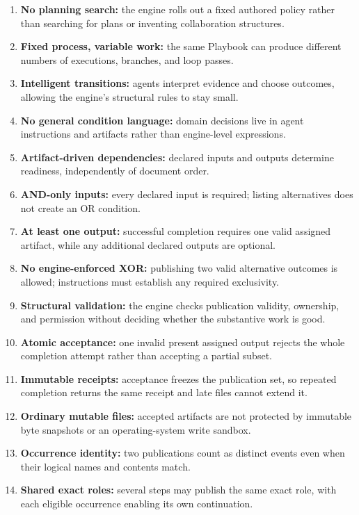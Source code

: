 \documentclass[letterpaper]{article}
\theoremstyle{definition}
\begin{document}
\begin{enumerate}
  \item \textbf{No planning search:} the engine rolls out a fixed authored policy rather than searching for plans or inventing collaboration structures.
  \item \textbf{Fixed process, variable work:} the same Playbook can produce different numbers of executions, branches, and loop passes.
  \item \textbf{Intelligent transitions:} agents interpret evidence and choose outcomes, allowing the engine's structural rules to stay small.
  \item \textbf{No general condition language:} domain decisions live in agent instructions and artifacts rather than engine-level expressions.
  \item \textbf{Artifact-driven dependencies:} declared inputs and outputs determine readiness, independently of document order.
  \item \textbf{AND-only inputs:} every declared input is required; listing alternatives does not create an OR condition.
  \item \textbf{At least one output:} successful completion requires one valid assigned artifact, while any additional declared outputs are optional.
  \item \textbf{No engine-enforced XOR:} publishing two valid alternative outcomes is allowed; instructions must establish any required exclusivity.
  \item \textbf{Structural validation:} the engine checks publication validity, ownership, and permission without deciding whether the substantive work is good.
  \item \textbf{Atomic acceptance:} one invalid present assigned output rejects the whole completion attempt rather than accepting a partial subset.
  \item \textbf{Immutable receipts:} acceptance freezes the publication set, so repeated completion returns the same receipt and late files cannot extend it.
  \item \textbf{Ordinary mutable files:} accepted artifacts are not protected by immutable byte snapshots or an operating-system write sandbox.
  \item \textbf{Occurrence identity:} two publications count as distinct events even when their logical names and contents match.
  \item \textbf{Shared exact roles:} several steps may publish the same exact role, with each eligible occurrence enabling its own continuation.

\end{enumerate}
\end{document}

